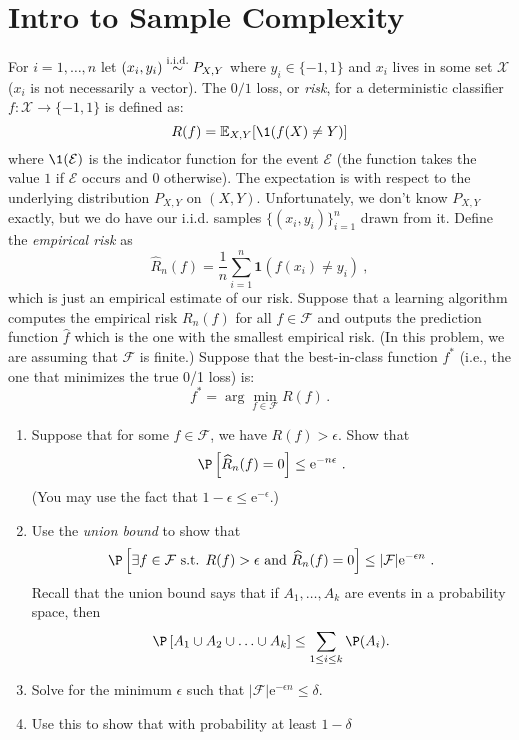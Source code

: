 \documentclass{article}
\providecommand*{\eu}{\ensuremath{\mathrm{e}}}
\begin{document}
\section*{Intro to Sample Complexity}
\begin{bprob}
    For $i=1,\dots,n$ let $(x_i,y_i) \overset{\rm i.i.d.}{\sim} P_{X,Y}$ where $y_i \in \{-1,1\}$ and $x_i$ lives in some set $\mathcal{X}$ ($x_i$ is not necessarily a vector). 
    The $0/1$ loss, or \emph{risk}, for a deterministic classifier $f\colon \mathcal{X} \rightarrow \{ -1,1 \}$ is defined as:
    $$R(f) = \mathbb E_{X,Y} [\1(f(X)\neq Y)]$$
    where $\1(\mathcal{E})$ is the indicator function for the event $\mathcal{E}$ (the function takes the value $1$ if $\mathcal{E}$ occurs and $0$ otherwise).
    The expectation is with respect to the underlying distribution $P_{X,Y}$ on $(X,Y)$.
    Unfortunately, we don't know $P_{X,Y}$ exactly, but we do have our i.i.d. samples $\{(x_i,y_i)\}_{i=1}^n$ drawn from it.
    Define the \emph{empirical risk} as 
    $$\widehat R_n(f) = \frac{1}{n} \sum_{i=1}^n \mathbf{1}(f(x_i)\neq y_i)\ ,$$
    which is just an empirical estimate of our risk.
    Suppose that a learning algorithm computes the empirical risk $R_n(f)$ for all $f \in \mathcal{F}$ and outputs the prediction function $\widehat f$ which is the one with the smallest empirical risk.
    (In this problem, we are assuming that  $\mathcal{F}$ is finite.)
    Suppose that the best-in-class function  $f^*$ (i.e., the one that minimizes the true 0/1 loss) is:
    $$f^* = \arg\min_{f \in \mathcal{F}} R(f) \, . $$
    \begin{enumerate}
        \item {} Suppose that for some $f \in \mathcal{F}$, we have $R(f) > \epsilon$. 
        Show that
        $$\P\left[ \widehat{R}_n(f) = 0 \right] \leq \eu^{-n \epsilon}\ .$$
        (You may use the fact that $1-\epsilon \le \eu^{-\epsilon}$.)
        \item {} Use the {\em union bound} to show that
        $$\P \left[\exists f \in \mathcal{F}\text{ s.t. } R(f) > \epsilon \text{ and }  \widehat{R}_n(f) = 0 \right] \le \lvert\mathcal{F}\rvert \eu^{-\epsilon n}\ .$$
        Recall that the union bound says that if $A_1, \ldots, A_k$ are events in a probability space, then 
        $$\P\left[A_1 \cup A_2 \cup \ldots \cup A_k\right] \le \sum_{1\le i \le k} \P(A_i).$$
        \item {} Solve for the minimum $\epsilon$ such that
        $\lvert \mathcal{F}\rvert \eu^{-\epsilon n} \le \delta$. 
        \item {} Use this to show that with probability at least $1-\delta$ 

\end{enumerate}
\end{bprob}
\end{document}
